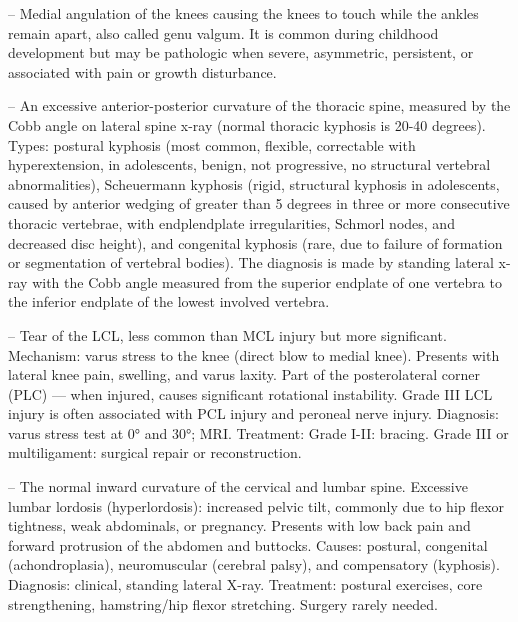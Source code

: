 -- Medial angulation of the knees causing the knees to touch while the ankles remain apart, also called genu valgum. It is common during childhood development but may be pathologic when severe, asymmetric, persistent, or associated with pain or growth disturbance.

-- An excessive anterior-posterior curvature of the thoracic spine, measured by the Cobb angle on lateral spine x-ray (normal thoracic kyphosis is 20-40 degrees). Types: postural kyphosis (most common, flexible, correctable with hyperextension, in adolescents, benign, not progressive, no structural vertebral abnormalities), Scheuermann kyphosis (rigid, structural kyphosis in adolescents, caused by anterior wedging of greater than 5 degrees in three or more consecutive thoracic vertebrae, with endplendplate irregularities, Schmorl nodes, and decreased disc height), and congenital kyphosis (rare, due to failure of formation or segmentation of vertebral bodies). The diagnosis is made by standing lateral x-ray with the Cobb angle measured from the superior endplate of one vertebra to the inferior endplate of the lowest involved vertebra.

-- Tear of the LCL, less common than MCL injury but more significant. Mechanism: varus stress to the knee (direct blow to medial knee). Presents with lateral knee pain, swelling, and varus laxity. Part of the posterolateral corner (PLC) — when injured, causes significant rotational instability. Grade III LCL injury is often associated with PCL injury and peroneal nerve injury. Diagnosis: varus stress test at 0° and 30°; MRI. Treatment: Grade I-II: bracing. Grade III or multiligament: surgical repair or reconstruction.

-- The normal inward curvature of the cervical and lumbar spine. Excessive lumbar lordosis (hyperlordosis): increased pelvic tilt, commonly due to hip flexor tightness, weak abdominals, or pregnancy. Presents with low back pain and forward protrusion of the abdomen and buttocks. Causes: postural, congenital (achondroplasia), neuromuscular (cerebral palsy), and compensatory (kyphosis). Diagnosis: clinical, standing lateral X-ray. Treatment: postural exercises, core strengthening, hamstring/hip flexor stretching. Surgery rarely needed.

